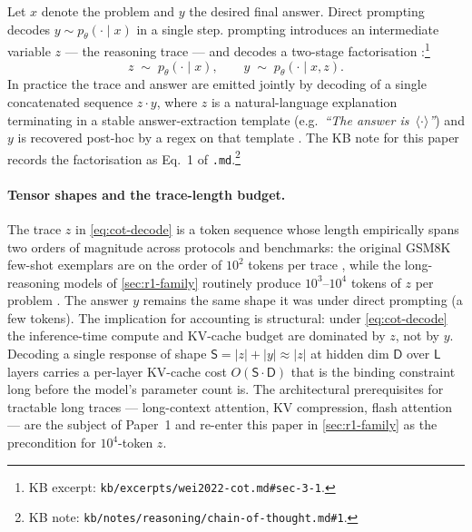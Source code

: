 Let $x$ denote the problem and $y$ the desired final answer. Direct
prompting decodes $y \sim p_\theta(\cdot \mid x)$ in a single step. 
prompting introduces an intermediate variable $z$ — the reasoning trace
— and decodes a two-stage factorisation
\citep[\S 3.1]{wei2022-cot}:\footnote{KB excerpt:
\nolinkurl{kb/excerpts/wei2022-cot.md#sec-3-1}.}
\begin{equation}
  z \;\sim\; p_\theta(\cdot \mid x), \qquad y \;\sim\; p_\theta(\cdot \mid x, z).
  \label{eq:cot-decode}
\end{equation}
In practice the trace and answer are emitted jointly by 
decoding of a single concatenated sequence $z \cdot y$, where $z$ is a
natural-language explanation terminating in a stable answer-extraction
template (e.g.\ \emph{``The answer is~$\langle\cdot\rangle$''}) and $y$
is recovered post-hoc by a regex on that template
\citep[\S 3.1]{wei2022-cot}. The KB note for this paper records the
factorisation as Eq.~1 of \texttt{.md}.\footnote{KB
note: \nolinkurl{kb/notes/reasoning/chain-of-thought.md#1}.}

\paragraph{Tensor shapes and the trace-length budget.} The trace $z$ in
\cref{eq:cot-decode} is a token sequence whose length empirically spans
two orders of magnitude across protocols and benchmarks: the original
GSM8K few-shot  exemplars are on the order of $10^2$ tokens per
trace \citep[\S 3.1]{wei2022-cot}, while the long- reasoning models
of \cref{sec:r1-family} routinely produce $10^3$--$10^4$ tokens of $z$
per problem \citep[\S 2.3]{deepseek-r1}. The answer $y$ remains the
same shape it was under direct prompting (a few tokens). The
implication for accounting is structural: under \cref{eq:cot-decode}
the inference-time compute and KV-cache budget are dominated by $z$,
not by $y$. Decoding a single  response of shape
$\mathsf{S} = |z| + |y| \approx |z|$ at hidden dim $\mathsf{D}$ over
$\mathsf{L}$ layers carries a per-layer KV-cache cost
$O(\mathsf{S} \cdot \mathsf{D})$ that is the binding constraint long
before the model's parameter count is. The architectural prerequisites
for tractable long traces — long-context attention, KV compression,
flash attention — are the subject of Paper~1 and re-enter this paper
in \cref{sec:r1-family} as the precondition for $10^4$-token $z$.

